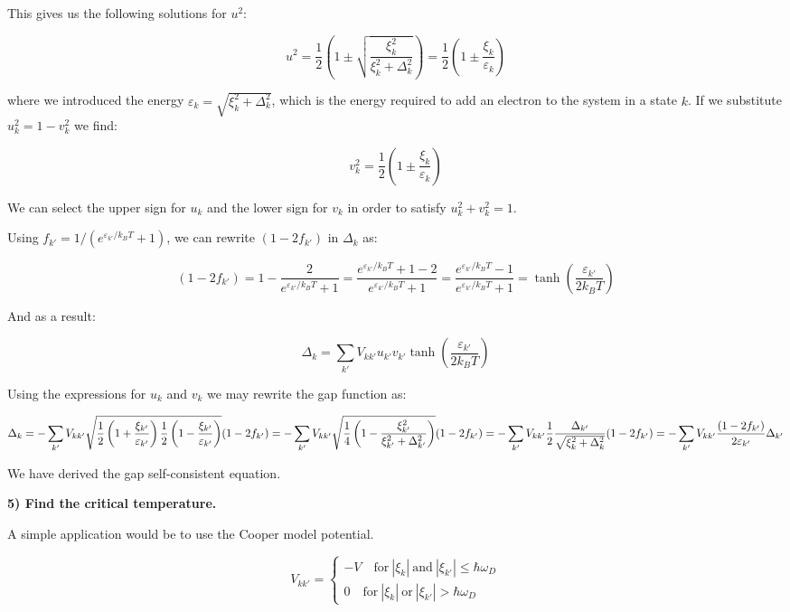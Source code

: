 This gives us the following solutions for \(u^2\):

\[ u^2 = \frac{1}{2}\left(1 \pm \sqrt{\frac{\xi_k^2}{\xi_k^2 + \Delta_k^2}}\right) = \frac{1}{2}\left(1 \pm \frac{\xi_k}{\varepsilon_k}\right)\]

where we introduced the energy
\(\varepsilon_k = \sqrt{\xi_k^2 + \Delta_k^2}\), which is the energy
required to add an electron to the system in a state \(k\). If we
substitute \(u_k^2 = 1 - v_k^2\) we find:

\[ v_k^2 = \frac{1}{2}\left(1 \pm \frac{\xi_k}{\varepsilon_k}\right)\]

We can select the upper sign for \(u_k\) and the lower sign for \(v_k\)
in order to satisfy \(u_k^2 + v_k^2 = 1\).

Using \(f_{k'} = 1/(e^{\varepsilon_{k'}/k_B T}+1)\), we can rewrite
\((1-2f_{k'})\) in \(\Delta_k\) as:

\[ (1-2 f_{k'}) = 1 - \frac{2}{e^{\varepsilon_{k'}/k_BT}+1} = \frac{e^{\varepsilon_{k'}/k_B T}+1 - 2}{e^{\varepsilon_{k'}/k_B T}+ 1} = \frac{e^{\varepsilon_{k'}/k_B T}-1}{e^{\varepsilon_{k'}/k_B T}+1} = \tanh \left(\frac{\varepsilon_{k'}}{2 k_B T} \right)\]

And as a result:

\[ \Delta_k = \sum_{k'} V_{kk'} u_{k'}v_{k'}\tanh \left(\frac{\varepsilon_{k'}}{2 k_B T} \right)\]

Using the expressions for \(u_k\) and \(v_k\) we may rewrite the gap
function as:

\[ \Delta_k = -\sum_{k'}V_{kk'} \sqrt{\frac{1}{2}\left(1+\frac{\xi_{k'}}{\varepsilon_{k'}}\right)\frac{1}{2}\left(1-\frac{\xi_{k'}}{\varepsilon_{k'}}\right)}(1 - 2 f_{k'}) \\ = -\sum_{k'}V_{kk'} \sqrt{\frac{1}{4}\left(1-\frac{\xi_{k'}^2}{\xi_{k'}^2 + \Delta_{k'}^2}\right)}(1 - 2 f_{k'}) \\ = -\sum_{k'}V_{kk'} \frac{1}{2}\frac{\Delta_{k'}}{\sqrt{\xi_k^2 + \Delta_k^2}}(1 - 2 f_{k'}) \\ = - \sum_{k'} V_{kk'}\frac{(1 - 2 f_{k'})}{2\varepsilon_{k'}}\Delta_{k'} \]

We have derived the gap self-consistent equation.

\textbf{5) Find the critical temperature.}

A simple application would be to use the Cooper model potential.

\[V_{kk'}=\left\{
                \begin{array}{ll}
                  -V \quad \textrm{for} \ |\xi_k| \ \textrm{and} \ |\xi_{k'}|\leq \hbar \omega_{D} \\
                  0 \quad \textrm{for} \ |\xi_k| \ \textrm{or} \ |\xi_{k'}| > \hbar \omega_D 
                \end{array}
              \right.
\]

